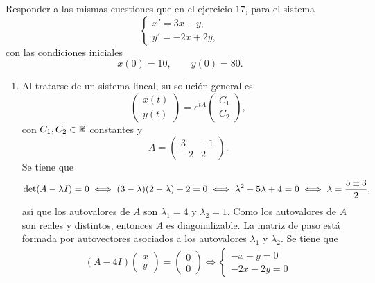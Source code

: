 \documentclass[11pt]{report}
\begin{document}
\addtocounter{exercise}{1}

\begin{exercise}
    Responder a las mismas cuestiones que en el ejercicio $17$, para el sistema
    \[\begin{cases}
        x' = 3x-y, \\
        y' = -2x+2y,
    \end{cases}\]
    con las condiciones iniciales
    \[x(0)=10, \qquad y(0) = 80.\]
\end{exercise}

\begin{solution}
    \hfill
    \begin{enumerate}
        \item Al tratarse de un sistema lineal, su solución general es
        \[\left(\begin{array}{c}
            x(t) \\
            y(t)
        \end{array}\right) = e^{tA}\left(\begin{array}{c}
            C_1 \\
            C_2
        \end{array}\right),\]
        con $C_1,C_2\in\mathbb R$ constantes y
        \[A = \left(\begin{array}{cc}
            3 & -1 \\
            -2 & 2
        \end{array}\right).\]
        Se tiene que
        \[\textup{det}(A-\lambda I) = 0 \iff (3-\lambda)(2-\lambda)-2 = 0 \iff \lambda^2-5\lambda+4 = 0 \iff \lambda = \frac{5\pm 3}{2},\]
        así que los autovalores de $A$ son $\lambda_1 = 4$ y $\lambda_2 = 1$. Como los autovalores de $A$ son reales y distintos, entonces $A$ es diagonalizable. La matriz de paso está formada por autovectores asociados a los autovalores $\lambda_1$ y $\lambda_2$. Se tiene que
        \begin{align*}
            (A-4I)\left(\begin{array}{c}
                x \\
                y
            \end{array}\right) = \left(\begin{array}{c}
                0 \\
                0
            \end{array}\right) \iff \begin{cases}
                -x-y = 0 \\
                -2x-2y = 0

\end{cases}
\end{align*}
\end{enumerate}
\end{solution}
\end{document}
